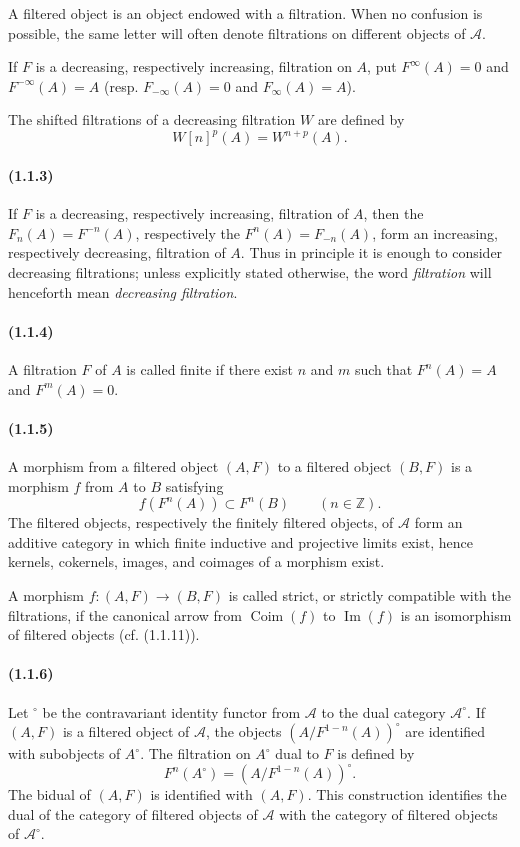 \documentclass[10pt]{article}
\newcommand{\Z}{\mathbb Z}
\newcommand{\Coim}{\operatorname{Coim}}
\newcommand{\Imop}{\operatorname{Im}}
\newcommand{\calA}{\mathcal A}
\begin{document}
A filtered object is an object endowed with a filtration. When no confusion is possible, the same letter will often denote filtrations on different objects of $\calA$.

If $F$ is a decreasing, respectively increasing, filtration on $A$, put $F^\infty(A)=0$ and $F^{-\infty}(A)=A$ (resp. $F_{-\infty}(A)=0$ and $F_{\infty}(A)=A$).

The shifted filtrations of a decreasing filtration $W$ are defined by
\[
W[n]^p(A)=W^{n+p}(A).
\]

\paragraph{(1.1.3)} If $F$ is a decreasing, respectively increasing, filtration of $A$, then the $F_n(A)=F^{-n}(A)$, respectively the $F^n(A)=F_{-n}(A)$, form an increasing, respectively decreasing, filtration of $A$. Thus in principle it is enough to consider decreasing filtrations; unless explicitly stated otherwise, the word \emph{filtration} will henceforth mean \emph{decreasing filtration}.

\paragraph{(1.1.4)} A filtration $F$ of $A$ is called finite if there exist $n$ and $m$ such that $F^n(A)=A$ and $F^m(A)=0$.

\paragraph{(1.1.5)} A morphism from a filtered object $(A,F)$ to a filtered object $(B,F)$ is a morphism $f$ from $A$ to $B$ satisfying
\[
f(F^n(A))\subset F^n(B)\qquad(n\in\Z).
\]
The filtered objects, respectively the finitely filtered objects, of $\calA$ form an additive category in which finite inductive and projective limits exist, hence kernels, cokernels, images, and coimages of a morphism exist.

A morphism $f:(A,F)\to(B,F)$ is called strict, or strictly compatible with the filtrations, if the canonical arrow from $\Coim(f)$ to $\Imop(f)$ is an isomorphism of filtered objects (cf. (1.1.11)).

\paragraph{(1.1.6)} Let ${}^{\circ}$ be the contravariant identity functor from $\calA$ to the dual category $\calA^{\circ}$. If $(A,F)$ is a filtered object of $\calA$, the objects $(A/F^{1-n}(A))^{\circ}$ are identified with subobjects of $A^{\circ}$. The filtration on $A^{\circ}$ dual to $F$ is defined by
\[
F^n(A^{\circ})=(A/F^{1-n}(A))^{\circ}.
\]
The bidual of $(A,F)$ is identified with $(A,F)$. This construction identifies the dual of the category of filtered objects of $\calA$ with the category of filtered objects of $\calA^{\circ}$.
\end{document}
